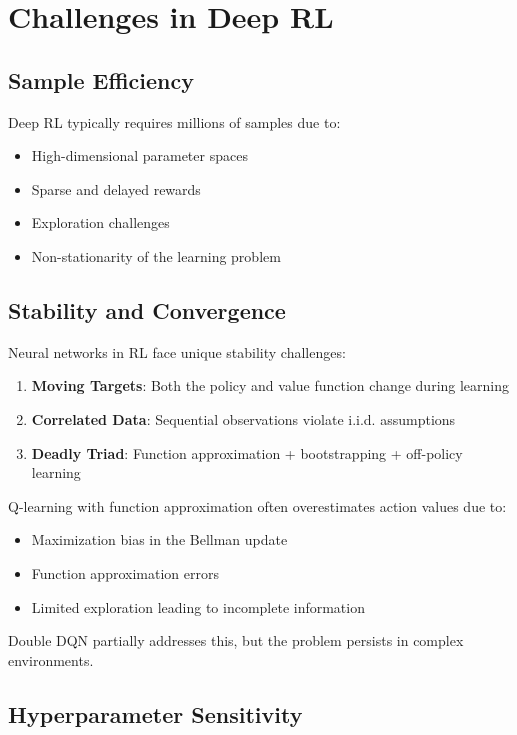 \section{Challenges in Deep RL}

\subsection{Sample Efficiency}

Deep RL typically requires millions of samples due to:
\begin{itemize}
\item High-dimensional parameter spaces
\item Sparse and delayed rewards
\item Exploration challenges
\item Non-stationarity of the learning problem
\end{itemize}

\subsection{Stability and Convergence}

Neural networks in RL face unique stability challenges:

\begin{enumerate}
\item \textbf{Moving Targets}: Both the policy and value function change during learning
\item \textbf{Correlated Data}: Sequential observations violate i.i.d. assumptions
\item \textbf{Deadly Triad}: Function approximation + bootstrapping + off-policy learning
\end{enumerate}

\begin{remarkbox}
Q-learning with function approximation often overestimates action values due to:
\begin{itemize}
\item Maximization bias in the Bellman update
\item Function approximation errors
\item Limited exploration leading to incomplete information
\end{itemize}
Double DQN partially addresses this, but the problem persists in complex environments.
\end{remarkbox}

\subsection{Hyperparameter Sensitivity}

